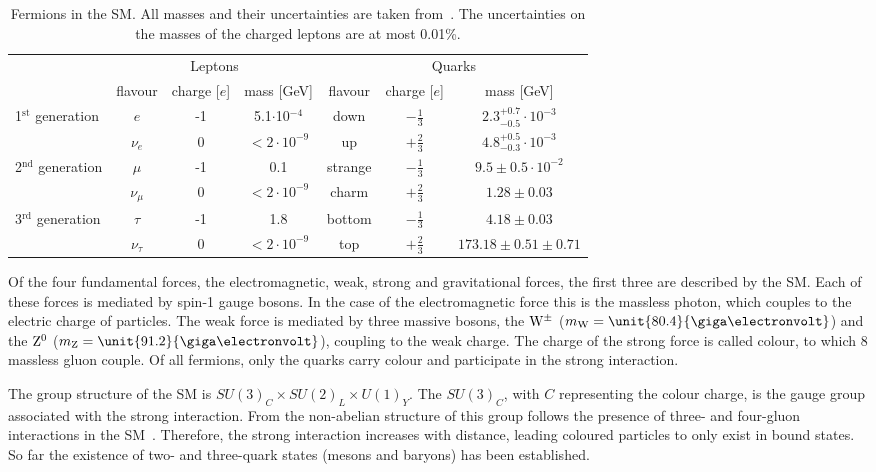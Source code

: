 \begin{table}
\centering
 \renewcommand{\arraystretch}{1.3}
\caption{Fermions in the SM. All masses and their uncertainties are taken from~\cite{PDG}. The uncertainties on the masses of the charged leptons are at most 0.01\%.}
\label{tab:fermions}
\begin{tabular}{l|c c c | c c c }
  & \multicolumn{3}{c|}{Leptons} & \multicolumn{3}{c}{Quarks} \\
    & flavour & charge [$e$] & mass [GeV] & flavour & charge [$e$] & mass [GeV] \\
    \hline
  \multirow{2}{*}{1$^{\mathrm{st}}$ generation} & $e$ & -1 & 5.1$\cdot$10$^{\mathrm{-4}}$ &  down & $-\frac{1}{3}$ & $2.3^{+0.7}_{-0.5}\cdot10^{-3}$ \\
 												& $\nu_e$ & 0 & $<2\cdot10^{-9}$ &  up & $+\frac{2}{3}$ & $4.8^{+0.5}_{-0.3}\cdot10^{-3}$  \\
 												\hline
  \multirow{2}{*}{2$^{\mathrm{nd}}$ generation} & $\mu$ & -1  & 0.1 & strange & $-\frac{1}{3}$ & $9.5\pm0.5\cdot10^{-2}$ \\
 												& $\nu_{\mu}$ & 0 & $<2\cdot10^{-9}$ & charm & $+\frac{2}{3}$ & $1.28\pm0.03$ \\
 												\hline
  \multirow{2}{*}{3$^{\mathrm{rd}}$ generation} & $\tau$ & -1 & 1.8 & bottom & $-\frac{1}{3}$ & $4.18\pm0.03$\\
 												& $\nu_{\tau}$ & 0 & $<2\cdot10^{-9}$ & top & $+\frac{2}{3}$ & $173.18\pm0.51\pm0.71$ \\ 												
 
 
\end{tabular}

\end{table}

Of the four fundamental forces, the electromagnetic, weak, strong and gravitational forces, the first three are described by the SM. Each of these forces is mediated by spin-1 gauge bosons. In the case of the electromagnetic force this is the massless photon, which couples to the electric charge of particles. The weak force is mediated by three massive bosons, the $\mathrm{W}^{\pm}$ ($m_{\W} = \unit{80.4}{\giga\electronvolt}$) and the $\mathrm{Z}^{0}$ ($m_{\mathrm{Z}} = \unit{91.2}{\giga\electronvolt}$), coupling to the weak charge. The charge of the strong force is called colour, to which 8 massless gluon couple. Of all fermions, only the quarks carry colour and participate in the strong interaction. 

The group structure of the SM is $SU(3)_C \times SU(2)_L \times U(1)_Y$. The $SU(3)_C$, with $C$ representing the colour charge, is the gauge group associated with the strong interaction. From the non-abelian structure of this group follows the presence of three- and four-gluon interactions in the SM~\cite{Pich:2007vu}. Therefore, the strong interaction increases with distance, leading coloured particles to only exist in bound states. So far the existence of two- and three-quark states (mesons and baryons) has been established. 

